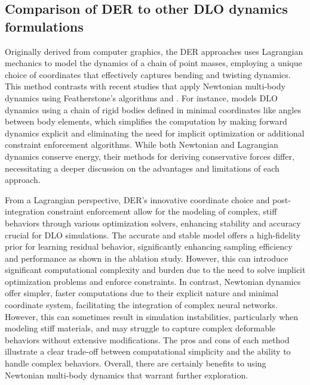 \subsection{Comparison of DER to other DLO dynamics formulations}
Originally derived from computer graphics, the DER approaches uses Lagrangian mechanics to model the dynamics of a chain of point masses, employing a unique choice of coordinates that effectively captures bending and twisting dynamics. 
This method contrasts with recent studies that apply Newtonian multi-body dynamics using Featherstone’s algorithms \cite{mamedov2024pseudorigidbodynetworkslearning} and \cite{mamedov2024learningdeformablelinearobject}. 
For instance, \cite{mamedov2024learningdeformablelinearobject} models DLO dynamics using a chain of rigid bodies defined in minimal coordinates like angles between body elements, which simplifies the computation by making forward dynamics explicit and eliminating the need for implicit optimization or additional constraint enforcement algorithms. 
While both Newtonian and Lagrangian dynamics conserve energy, their methods for deriving conservative forces differ, necessitating a deeper discussion on the advantages and limitations of each approach.

From a Lagrangian perspective, DER’s innovative coordinate choice and post-integration constraint enforcement allow for the modeling of complex, stiff behaviors through various optimization solvers, enhancing stability and accuracy crucial for DLO simulations. 
The accurate and stable model offers a high-fidelity prior for learning residual behavior, significantly enhancing sampling efficiency and performance as shown in the ablation study.
However, this can introduce significant computational complexity and burden due to the need to solve implicit optimization problems and enforce constraints. 
In contrast, Newtonian dynamics offer simpler, faster computations due to their explicit nature and minimal coordinate system, facilitating the integration of complex neural networks. 
However, this can sometimes result in simulation instabilities, particularly when modeling stiff materials, and may struggle to capture complex deformable behaviors without extensive modifications. 
The pros and cons of each method illustrate a clear trade-off between computational simplicity and the ability to handle complex behaviors.
Overall, there are certainly benefits to using Newtonian multi-body dynamics that warrant further exploration. 
